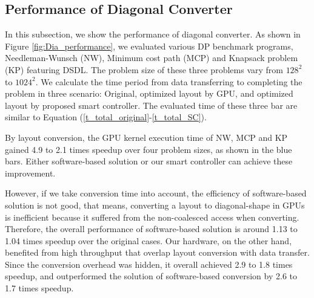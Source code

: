 \documentclass[10pt,journal,compsoc]{IEEEtran}
\begin{document}
\subsection{Performance of Diagonal Converter}
In this subsection, we show the performance of diagonal converter.
As shown in Figure \ref{fig:Dia_performance}, we evaluated various DP benchmark programs, Needleman-Wunsch (NW), Minimum cost path (MCP) and Knapsack problem (KP) featuring DSDL. The problem size of these three problems vary from $128^2$ to $1024^2$. We calculate the time period from data transferring  to completing the problem in three scenario: Original, optimized layout by GPU, and optimized layout by proposed smart controller. The evaluated time of these three bar are similar to Equation (\ref{t_total_original}-\ref{t_total_SC}).



\indent By layout conversion, the GPU kernel execution time of NW, MCP and KP gained 4.9 to 2.1 times speedup over four problem sizes, as shown in the blue bars. Either software-based solution or our smart controller can  achieve these improvement.

However, if we take conversion time into account, the efficiency of software-based solution is not good, that means, converting a layout to diagonal-shape in GPUs is inefficient   because it suffered from the non-coalesced access when converting. Therefore, the overall performance of software-based solution is around  1.13 to 1.04 times speedup over the original cases. Our hardware, on the other hand, benefited from high throughput that overlap layout conversion with data transfer. Since the conversion overhead was hidden, it overall achieved 2.9 to 1.8 times speedup, and outperformed the solution of software-based conversion by 2.6 to 1.7 times speedup.%
\end{document}
